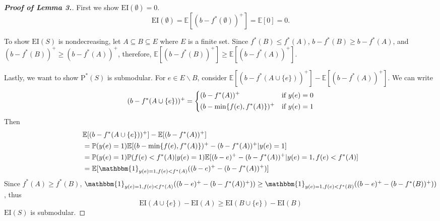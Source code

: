 \documentclass[12pt]{article}
\newcommand{\E}{\mathbb{E}}
\newcommand{\EI}{\mathrm{EI}}
\newcommand{\PI}{\text{P}^*}
\begin{document}
\begin{proof}[\bf{Proof of Lemma 3.}]
First we show $\EI(\emptyset) = 0$.
\begin{equation*}
  \EI(\emptyset) = \E[(b-f^*(\emptyset))^+] = \E[0] = 0.
\end{equation*}

To show $\EI(S)$ is nondecreasing, let $A \subseteq B \subseteq E$ where $E$ is a finite set. Since $f^*(B) \leq f^*(A)$, $b-f^*(B) \geq b-f^*(A)$, and $(b-f^*(B))^+ \geq (b-f^*(A))^+$, therefore, $\E[(b-f^*(B))^+] \geq \E[(b-f^*(A))^+]$.

Lastly, we want to show $\PI(S)$ is submodular. For $e \in E\backslash B$, consider $\E[(b-f^*(A \cup \{e\}))^+]-\E[(b-f^*(A))^+]$. We can write
\begin{equation*}
(b-f^*(A \cup \{e\}))^+ = \begin{dcases}
                         (b-f^*(A))^+ & \text{if $y(e)=0$} \\
                         (b-\min\{f(e),f^*(A)\})^+ & \text{if $y(e)=1$}
                         \end{dcases}
\end{equation*}
Then 
\begin{align*}
&\E[(b-f^*(A \cup \{e\}))^+]-\E[(b-f^*(A))^+] \\
&= \mathbb{P}(y(e)=1) \E[(b-\min\{f(e),f^*(A)\})^+ -(b-f^*(A))^+|y(e)=1]\\
&= \mathbb{P}(y(e)=1) \mathbb{P}(f(e)<f^*(A)|y(e)=1) \E[(b-e)^+-(b-f^*(A))^+|y(e)=1, f(e)<f^*(A)]\\
&= \E[ \mathbbm{1}_{y(e)=1, f(e)<f^*(A)} ((b-e)^+-(b-f^*(A))^+)]
\end{align*}
Since $f^*(A) \geq f^*(B)$, $\mathbbm{1}_{y(e)=1, f(e)<f^*(A)} ((b-e)^+-(b-f^*(A))^+)) \geq \mathbbm{1}_{y(e)=1, f(e)<f^*(B)} ((b-e)^+-(b-f^*(B))^+))$, thus
\begin{equation*}
\EI(A\cup \{e\})-\EI(A) \geq \EI(B\cup \{e\})-\EI(B)
\end{equation*}
$\EI(S)$ is submodular. 
\end{proof}
\end{document}
